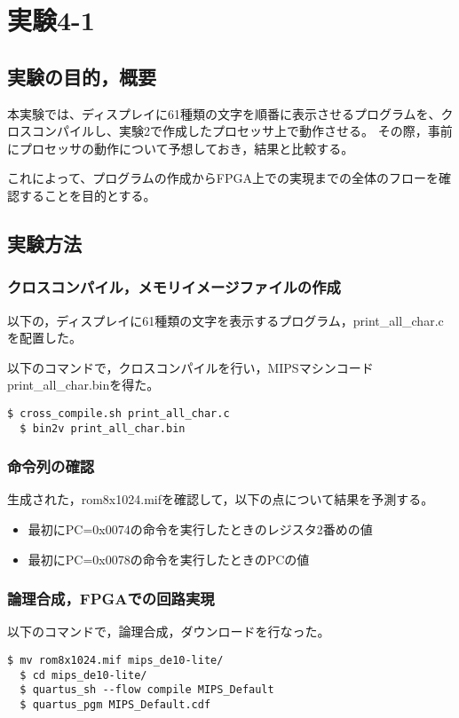 \section{実験4-1}
\subsection{実験の目的，概要}
本実験では、ディスプレイに61種類の文字を順番に表示させるプログラムを、クロスコンパイルし、実験2で作成したプロセッサ上で動作させる。
その際，事前にプロセッサの動作について予想しておき，結果と比較する。

これによって、プログラムの作成からFPGA上での実現までの全体のフローを確認することを目的とする。

\subsection{実験方法}
\subsubsection{クロスコンパイル，メモリイメージファイルの作成}
以下の，ディスプレイに61種類の文字を表示するプログラム，print\_all\_char.cを配置した。


以下のコマンドで，クロスコンパイルを行い，MIPSマシンコードprint\_all\_char.binを得た。
\begin{lstlisting}[caption={クロスコンパイル，メモリイメージファイルの作成},label={クロスコンパイル，イメージファイルの作成4-1}]
  $ cross_compile.sh print_all_char.c
  $ bin2v print_all_char.bin
\end{lstlisting}

\subsubsection{命令列の確認}
生成された，rom8x1024.mifを確認して，以下の点について結果を予測する。
\begin{itemize}
  \item 最初にPC=0x0074の命令を実行したときのレジスタ2番めの値
  \item 最初にPC=0x0078の命令を実行したときのPCの値
\end{itemize}

\subsubsection{論理合成，FPGAでの回路実現}
以下のコマンドで，論理合成，ダウンロードを行なった。
\begin{lstlisting}[caption={論理合成，ダウンロード},label={論理合成，ダウンロード4-1}]
  $ mv rom8x1024.mif mips_de10-lite/
  $ cd mips_de10-lite/
  $ quartus_sh --flow compile MIPS_Default
  $ quartus_pgm MIPS_Default.cdf
\end{lstlisting}

